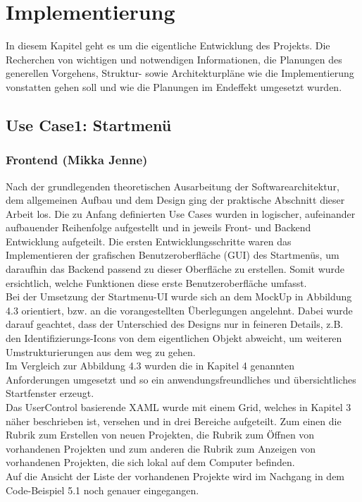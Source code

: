 \chapter{Implementierung}
In diesem Kapitel geht es um die eigentliche Entwicklung des Projekts. Die Recherchen von wichtigen und notwendigen Informationen, 
die Planungen des generellen Vorgehens, Struktur- sowie Architekturpläne wie die Implementierung vonstatten gehen soll und wie die 
Planungen im Endeffekt umgesetzt wurden.
\section{Use Case1: Startmenü}
\subsection{Frontend (Mikka Jenne)}
Nach der grundlegenden theoretischen Ausarbeitung der Softwarearchitektur, dem allgemeinen Aufbau und dem Design ging der praktische Abschnitt
dieser Arbeit los. Die zu Anfang definierten Use Cases wurden in logischer, aufeinander aufbauender Reihenfolge aufgestellt und in jeweils Front- und Backend Entwicklung
aufgeteilt. 
Die ersten Entwicklungsschritte waren das Implementieren der grafischen Benutzeroberfläche (GUI) des Startmenüs, um daraufhin das Backend passend zu dieser
Oberfläche zu erstellen. Somit wurde ersichtlich, welche Funktionen diese erste Benutzeroberfläche umfasst.
\\
\linebreak
Bei der Umsetzung der Startmenu-UI wurde sich an dem MockUp in Abbildung 4.3 orientiert, bzw. an die vorangestellten 
Überlegungen angelehnt.
Dabei wurde darauf geachtet, dass der Unterschied des Designs nur in feineren Details, z.B. den Identifizierungs-Icons von dem eigentlichen Objekt abweicht, um weiteren
Umstrukturierungen aus dem weg zu gehen.
\\Im Vergleich zur Abbildung 4.3 wurden die in Kapitel 4 genannten Anforderungen umgesetzt und so ein anwendungsfreundliches 
und übersichtliches Startfenster erzeugt. 
\\Das UserControl basierende XAML wurde mit einem Grid, welches in Kapitel 3 näher beschrieben ist, versehen und 
in drei Bereiche aufgeteilt. Zum einen die Rubrik zum Erstellen von neuen Projekten, die Rubrik zum Öffnen von vorhandenen Projekten und zum anderen 
die Rubrik zum Anzeigen von vorhandenen Projekten, die sich lokal auf dem Computer befinden.
\\Auf die Ansicht der Liste der vorhandenen Projekte wird im Nachgang in dem Code-Beispiel 5.1 noch genauer eingegangen.
